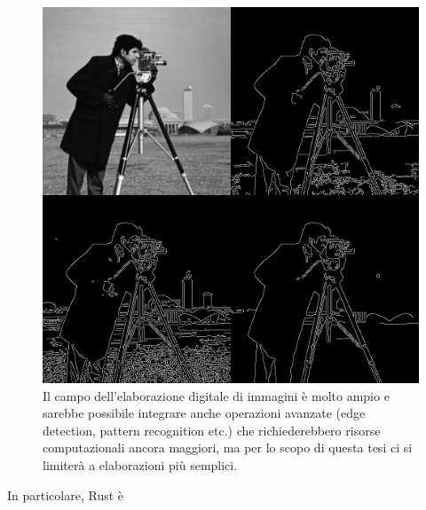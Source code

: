 \begin{figure}
        \begin{center}
                \includegraphics[width=0.6\columnwidth]{images/imageProc.jpg}
        \end{center}
        \caption{Il campo dell'elaborazione digitale di immagini è molto ampio e sarebbe possibile integrare anche operazioni avanzate (edge detection, pattern recognition etc.) che richiederebbero risorse computazionali ancora maggiori, ma per lo scopo di questa tesi ci si limiterà a elaborazioni più semplici.}
        \label{fig:imageProc}
\end{figure}
In particolare, Rust è
